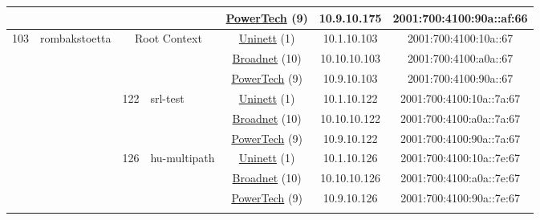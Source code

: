 \begin{small}
\begin{center}
\begin{longtable}{|c|c|c|c|c|c|c|c|}
  &  &  &  & \multicolumn{2}{|c|}{\tiny{\href{http://www.powertech.no}{PowerTech} (9)}} & \tiny{10.9.10.175} & \tiny{2001:700:4100:90a::af:66} \\ \hline
 \multirow{42}{*}{\tiny{103}} & \multicolumn{1}{|l|}{\multirow{42}{*}{\tiny{rombakstoetta}}} & \multicolumn{2}{|c|}{\multirow{3}{*}{\tiny{Root Context}}} & \multicolumn{2}{|c|}{\tiny{\href{https://www.uninett.no}{Uninett} (1)}} & \tiny{10.1.10.103} & \tiny{2001:700:4100:10a::67} \\* \cline{5-5}\cline{6-6}\cline{7-7}\cline{8-8}
  &  & \multicolumn{2}{|c|}{} & \multicolumn{2}{|c|}{\tiny{\href{https://www.broadnet.no}{Broadnet} (10)}} & \tiny{10.10.10.103} & \tiny{2001:700:4100:a0a::67} \\* \cline{5-5}\cline{6-6}\cline{7-7}\cline{8-8}
  &  & \multicolumn{2}{|c|}{} & \multicolumn{2}{|c|}{\tiny{\href{http://www.powertech.no}{PowerTech} (9)}} & \tiny{10.9.10.103} & \tiny{2001:700:4100:90a::67} \\* \cline{3-3}\cline{4-4}\cline{5-5}\cline{6-6}\cline{7-7}\cline{8-8}
  &  & \multirow{3}{*}{\tiny{122}} & \multicolumn{1}{|l|}{\multirow{3}{*}{\tiny{srl-test}}} & \multicolumn{2}{|c|}{\tiny{\href{https://www.uninett.no}{Uninett} (1)}} & \tiny{10.1.10.122} & \tiny{2001:700:4100:10a::7a:67} \\* \cline{5-5}\cline{6-6}\cline{7-7}\cline{8-8}
  &  &  &  & \multicolumn{2}{|c|}{\tiny{\href{https://www.broadnet.no}{Broadnet} (10)}} & \tiny{10.10.10.122} & \tiny{2001:700:4100:a0a::7a:67} \\* \cline{5-5}\cline{6-6}\cline{7-7}\cline{8-8}
  &  &  &  & \multicolumn{2}{|c|}{\tiny{\href{http://www.powertech.no}{PowerTech} (9)}} & \tiny{10.9.10.122} & \tiny{2001:700:4100:90a::7a:67} \\* \cline{3-3}\cline{4-4}\cline{5-5}\cline{6-6}\cline{7-7}\cline{8-8}
  &  & \multirow{3}{*}{\tiny{126}} & \multicolumn{1}{|l|}{\multirow{3}{*}{\tiny{hu-multipath}}} & \multicolumn{2}{|c|}{\tiny{\href{https://www.uninett.no}{Uninett} (1)}} & \tiny{10.1.10.126} & \tiny{2001:700:4100:10a::7e:67} \\* \cline{5-5}\cline{6-6}\cline{7-7}\cline{8-8}
  &  &  &  & \multicolumn{2}{|c|}{\tiny{\href{https://www.broadnet.no}{Broadnet} (10)}} & \tiny{10.10.10.126} & \tiny{2001:700:4100:a0a::7e:67} \\* \cline{5-5}\cline{6-6}\cline{7-7}\cline{8-8}
  &  &  &  & \multicolumn{2}{|c|}{\tiny{\href{http://www.powertech.no}{PowerTech} (9)}} & \tiny{10.9.10.126} & \tiny{2001:700:4100:90a::7e:67} \\* \cline{3-3}\cline{4-4}\cline{5-5}\cline{6-6}\cline{7-7}\cline{8-8}

\end{longtable}
\end{center}
\end{small}
